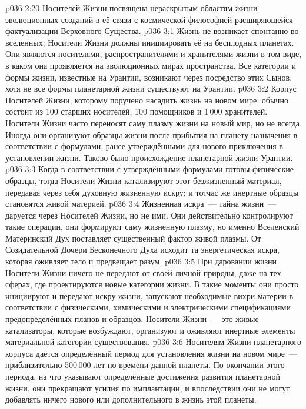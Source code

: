 \vs p036 2:20 \pc {} Носителей Жизни посвящена нераскрытым областям жизни эволюционных созданий в её связи с космической философией расширяющейся фактуализации Верховного Существа.
\vs p036 3:1 Жизнь не возникает спонтанно во вселенных; Носители Жизни должны инициировать её на бесплодных планетах. Они являются носителями, распространителями и хранителями жизни в том виде, в каком она проявляется на эволюционных мирах пространства. Все категории и формы жизни, известные на Урантии, возникают через посредство этих Сынов, хотя не все формы планетарной жизни существуют на Урантии.
\vs p036 3:2 Корпус Носителей Жизни, которому поручено насадить жизнь на новом мире, обычно состоит из 100 старших носителей, 100 помощников и 1\,000 хранителей. Носители Жизни часто переносят саму плазму жизни на новый мир, но не всегда. Иногда они организуют образцы жизни после прибытия на планету назначения в соответствии с формулами, ранее утверждёнными для нового приключения в установлении жизни. Таково было происхождение планетарной жизни Урантии.
\vs p036 3:3 Когда в соответствии с утверждёнными формулами готовы физические образцы, тогда Носители Жизни катализируют этот безжизненный материал, передавая через себя духовную жизненную искру; и тотчас же инертные образцы становятся живой материей.
\vs p036 3:4 \pc Жизненная искра~--- тайна жизни~--- даруется через Носителей Жизни, но не ими. Они действительно контролируют такие операции, они формируют саму жизненную плазму, но именно Вселенский Материнский Дух поставляет существенный фактор живой плазмы. От Созидательной Дочери Бесконечного Духа исходит та энергетическая искра, которая оживляет тело и предвещает разум.
\vs p036 3:5 \pc При даровании жизни Носители Жизни ничего не передают от своей личной природы, даже на тех сферах, где проектируются новые категории жизни. В такие моменты они просто инициируют и передают искру жизни, запускают необходимые вихри материи в соответствии с физическими, химическими и электрическими спецификациями предопределённых планов и образцов. Носители Жизни~--- это живые катализаторы, которые возбуждают, организуют и оживляют инертные элементы материальной категории существования.
\vs p036 3:6 \pc Носителям Жизни планетарного корпуса даётся определённый период для установления жизни на новом мире~--- приблизительно 500\,000 лет по времени данной планеты. По окончании этого периода, на что указывают определённые достижения развития планетарной жизни, они прекращают усилия по имплантации, и впоследствии они не могут добавлять ничего нового или дополнительного в жизнь этой планеты.
